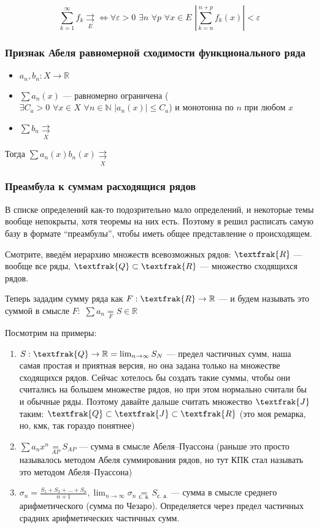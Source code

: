 \documentclass{article}
\def\dbl{\,\,}
\def\rsh#1{\underset{#1}{\rightrightarrows}}
\def\rshe{\rsh{E}}
\def\eqby#1{\underset{#1}{=}}
\begin{document}
\[\sum_{k = 1}^{\infty} f_k \rshe \Leftrightarrow \forall \varepsilon > 0 \dbl \exists n \dbl \forall p \dbl \forall x \in E \dbl \left|\sum_{k = n}^{n + p} f_k(x)\right| < \varepsilon \]

\subsubsection{Признак Абеля равномерной сходимости функционального ряда}

\begin{itemize}
    \item $a_n, b_n: X \rightarrow \mathbb{R}$
    \item $\sum a_n(x)$ --- равномерно ограничена ($\exists C_a > 0 \dbl \forall x \in X \dbl \forall n \in \mathbb{N} \dbl |a_n(x)| \le C_a$) и монотонна по $n$ при любом $x$
    \item $\sum b_n \rsh{X}$
\end{itemize}

Тогда $\sum a_n(x) b_n(x) \rsh{X}$

\subsubsection{Преамбула к суммам расходящися рядов}

В списке определений как-то подозрительно мало определений, и некоторые темы вообще непокрыты, хотя теоремы на них есть. Поэтому я решил расписать самую базу в формате ``преамбулы'', чтобы иметь общее представление о происходящем.

Смотрите, введём иерархию множеств всевозможных рядов: $\textfrak{R}$ --- вообще все ряды, $\textfrak{Q} \subset \textfrak{R}$ --- множество сходящихся рядов.

Теперь зададим сумму ряда как $F: \textfrak{R} \rightarrow \mathbb{R}$ --- и будем называть это суммой в смысле $F: \dbl \sum a_n \eqby{F} S \in \mathbb{R}$

Посмотрим на примеры: 

\begin{enumerate}
    \item $S: \textfrak{Q} \rightarrow \mathbb{R} = \lim_{n \rightarrow \infty} S_N$ --- предел частичных сумм, наша самая простая и приятная версия, но она задана только на множестве сходящихся рядов. Сейчас хотелось бы создать такие суммы, чтобы они считались на большем множестве рядов, но при этом нормально считали бы и обычные ряды. Поэтому давайте дальше считать множество $\textfrak{J}$ таким: $\textfrak{Q} \subset \textfrak{J} \subset \textfrak{R}$ (это моя ремарка, но, кмк, так гораздо понятнее)
    \item $\sum a_n x^n \eqby{AP} S_{AP}$ --- сумма в смысле Абеля--Пуассона (раньше это просто называлось методом Абеля суммирования рядов, но тут КПК стал называть это методом Абеля--Пуассона)
    \item $\sigma_n = \frac{S_1 + S_2 + \ldots + S_n}{n + 1}, \lim_{n \rightarrow \infty} \sigma_n \eqby{\text{с. а.}} S_{\text{с. а.}}$ --- сумма в смысле среднего арифметического (сумма по Чезаро). Определяется через предел частичных срадних арифметических частичных сумм.
\end{enumerate}
\end{document}

